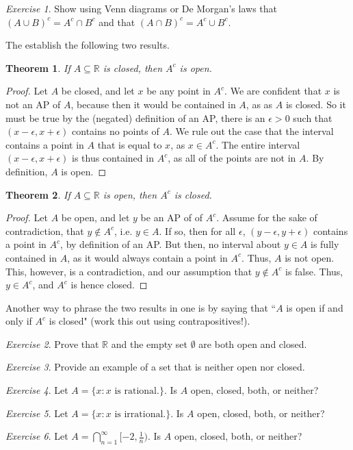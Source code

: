 \documentclass[11pt]{article}
\newcommand{\R}{\ensuremath{\mathbb R}}
\newcommand{\e}{\epsilon}
\newcommand{\sse}{\subseteq}
\theoremstyle{plain}
\newtheorem{thm}{Theorem}[section]
\theoremstyle{definition}
\theoremstyle{remark}
\newtheorem{exc}{Exercise}[section]
\begin{document}
\begin{exc}
    Show using Venn diagrams or De Morgan's laws that $(A \cup B)^c = A^c \cap B^c$ and that $(A \cap B)^c = A^c \cup B^c$.
\end{exc}
The establish the following two results.
\begin{thm}
    If $A \sse \R$ is closed, then $A^c$ is open.
\end{thm}
\begin{proof}
    Let $A$ be closed, and let $x$ be any point in $A^c$. We are confident that $x$ is not an AP of $A$, because then it would be contained in $A$, as as $A$ is closed. So it must be true by the (negated) definition of an AP, there is an $\e > 0$ such that $(x - \e, x + \e)$ contains no points of $A$. We rule out the case that the interval contains a point in $A$ that is equal to $x$, as $x \in A^c$. The entire interval $(x - \e, x + \e)$ is thus contained in $A^c$, as all of the points are not in $A$. By definition, $A$ is open.
\end{proof}
\begin{thm}
    If $A \sse \R$ is open, then $A^c$ is closed.
\end{thm}
\begin{proof}
    Let $A$ be open, and let $y$ be an AP of of $A^c$. Assume for the sake of contradiction, that $y \notin A^c$, i.e. $y \in A$. If so, then for all $\e$, $(y - \e, y + \e)$ contains a point in $A^c$, by definition of an AP. But then, no interval about $y \in A$ is fully contained in $A$, as it would always contain a point in $A^c$. Thus, $A$ is not open. This, however, is a contradiction, and our assumption that $y \notin A^c$ is false. Thus, $y \in A^c$, and $A^c$ is hence closed.
\end{proof}
Another way to phrase the two results in one is by saying that ``$A$ is open if and only if $A^c$ is closed" (work this out using contrapositives!). 

\begin{exc}
    Prove that $\R$ and the empty set $\emptyset$ are both open and closed.
\end{exc}
\begin{exc}
    Provide an example of a set that is neither open nor closed.
\end{exc}
\begin{exc}
    Let $A = \{x : x \text{ is rational.}\}$. Is $A$ open, closed, both, or neither?
\end{exc}
\begin{exc}
    Let $A = \{x : x \text{ is irrational.}\}$. Is $A$ open, closed, both, or neither?
\end{exc}
\begin{exc}
    Let $A = \bigcap_{n=1}^\infty [-2, \frac{1}{n})$. Is $A$ open, closed, both, or neither?
\end{exc}
\end{document}
